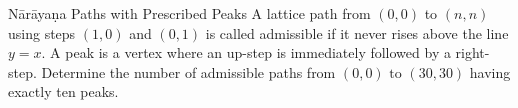 \begin{problem}{Nārāyaṇa Paths with Prescribed Peaks}
    A lattice path from \((0,0)\) to \((n,n)\) using steps \((1,0)\) and \((0,1)\) is called admissible if it never rises above the line \(y=x.\) A peak is a vertex where an up-step is immediately followed by a right-step. Determine the number of admissible paths from \((0,0)\text{ to }(30,30)\) having exactly ten peaks.
    
\end{problem}
